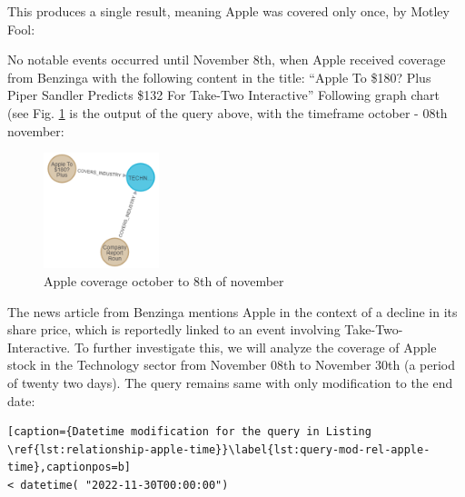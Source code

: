 \noindent This produces a single result, meaning Apple was covered only once, by Motley Fool:

\begin{table}[h]
\centering
{}
\end{table}

\noindent No notable events occurred until November 8th, when Apple received coverage from Benzinga with the following content in the title: “Apple To \$180? Plus Piper Sandler Predicts \$132 For Take-Two Interactive” Following graph chart (see Fig. \ref{fig:newsitems-apple-coverage-october-8th-november} is the output of the query above, with the timeframe october - 08th november:


\begin{figure}[h]
 \centering
 \includegraphics[width=0.3\textwidth]{images/apple-two-news.png}
 \caption{Apple coverage october to 8th of november }
 \label{fig:newsitems-apple-coverage-october-8th-november}
\end{figure}

The news article from Benzinga mentions Apple in the context of a decline in its share price, which is reportedly linked to an event involving Take-Two-Interactive. To further investigate this, we will analyze the coverage of Apple stock in the Technology sector from November 08th to November 30th (a period of twenty two days). The query remains same with only modification to the end date:

\begin{lstlisting}[caption={Datetime modification for the query in Listing \ref{lst:relationship-apple-time}}\label{lst:query-mod-rel-apple-time},captionpos=b]
< datetime( "2022-11-30T00:00:00")
\end{lstlisting}

